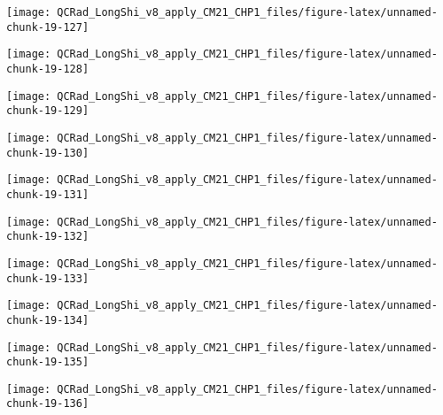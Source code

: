 \documentclass[
  10pt,
  a4paper,oneside]{article}
\begin{document}
\begin{center}\texttt{[image: QCRad\_LongShi\_v8\_apply\_CM21\_CHP1\_files/figure-latex/unnamed-chunk-19-127]} \end{center}

\begin{center}\texttt{[image: QCRad\_LongShi\_v8\_apply\_CM21\_CHP1\_files/figure-latex/unnamed-chunk-19-128]} \end{center}

\begin{center}\texttt{[image: QCRad\_LongShi\_v8\_apply\_CM21\_CHP1\_files/figure-latex/unnamed-chunk-19-129]} \end{center}

\begin{center}\texttt{[image: QCRad\_LongShi\_v8\_apply\_CM21\_CHP1\_files/figure-latex/unnamed-chunk-19-130]} \end{center}

\begin{center}\texttt{[image: QCRad\_LongShi\_v8\_apply\_CM21\_CHP1\_files/figure-latex/unnamed-chunk-19-131]} \end{center}

\begin{center}\texttt{[image: QCRad\_LongShi\_v8\_apply\_CM21\_CHP1\_files/figure-latex/unnamed-chunk-19-132]} \end{center}

\begin{center}\texttt{[image: QCRad\_LongShi\_v8\_apply\_CM21\_CHP1\_files/figure-latex/unnamed-chunk-19-133]} \end{center}

\begin{center}\texttt{[image: QCRad\_LongShi\_v8\_apply\_CM21\_CHP1\_files/figure-latex/unnamed-chunk-19-134]} \end{center}

\begin{center}\texttt{[image: QCRad\_LongShi\_v8\_apply\_CM21\_CHP1\_files/figure-latex/unnamed-chunk-19-135]} \end{center}

\begin{center}\texttt{[image: QCRad\_LongShi\_v8\_apply\_CM21\_CHP1\_files/figure-latex/unnamed-chunk-19-136]} \end{center}
\end{document}
